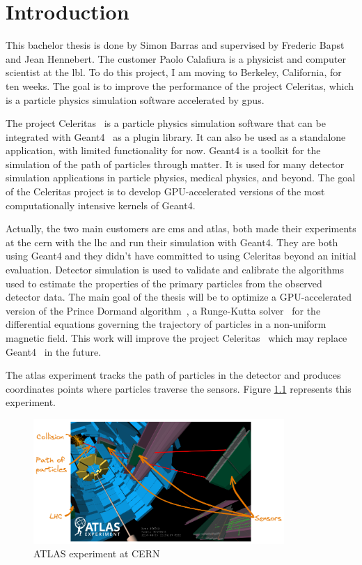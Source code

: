 \chapter{Introduction}
\label{ch:introduction}

This bachelor thesis is done by Simon Barras and supervised by Frederic Bapst and Jean Hennebert.
The customer Paolo Calafiura is a physicist and computer scientist at the \acrfull{lbl}.
To do this project, I am moving to Berkeley, California, for ten weeks.
The goal is to improve the performance of the project Celeritas, which is a particle physics simulation software accelerated by \acrshort{gpu}s.

The project Celeritas~\cite{Celeritas-Project} is a particle physics simulation software that can be integrated with Geant4~\cite{geant4} as a plugin library.
It can also be used as a standalone application, with limited functionality for now.
Geant4 is a toolkit for the simulation of the path of particles through matter.
It is used for many detector simulation applications in particle physics, medical physics, and beyond.
The goal of the Celeritas project is to develop GPU-accelerated versions of the most computationally intensive kernels of Geant4.

Actually, the two main customers are \acrshort{cms} and \acrshort{atlas}, both made their experiments at the \acrfull{cern} with the \acrfull{lhc} and run their simulation with Geant4.
They are both using Geant4 and they didn't have committed to using Celeritas beyond an initial evaluation.
Detector simulation is used to validate and calibrate the algorithms used to estimate the properties of the primary particles from the observed detector data.
The main goal of the thesis will be to optimize a GPU-accelerated version of the Prince Dormand algorithm~\cite{princeDormand}, a Runge-Kutta solver~\cite{Runge-Kutta-methods} for the differential equations governing the trajectory of particles in a non-uniform magnetic field.
This work will improve the project Celeritas~\cite{Celeritas-Project} which may replace Geant4~\cite{geant4} in the future.

The \acrfull{atlas} experiment tracks the path of particles in the detector and produces coordinates points where particles traverse the sensors.
Figure \ref{fig:introduction:particles:tracking} represents this experiment.
\begin{figure}[ht]
    \centering
    \includegraphics[width=0.85\textwidth]{05-resources/img/spec/experiment-atlas.excalidraw.png}
    \caption{ATLAS experiment at CERN~\cite{atlas-experiment}}
    \label{fig:introduction:particles:tracking}
\end{figure}


